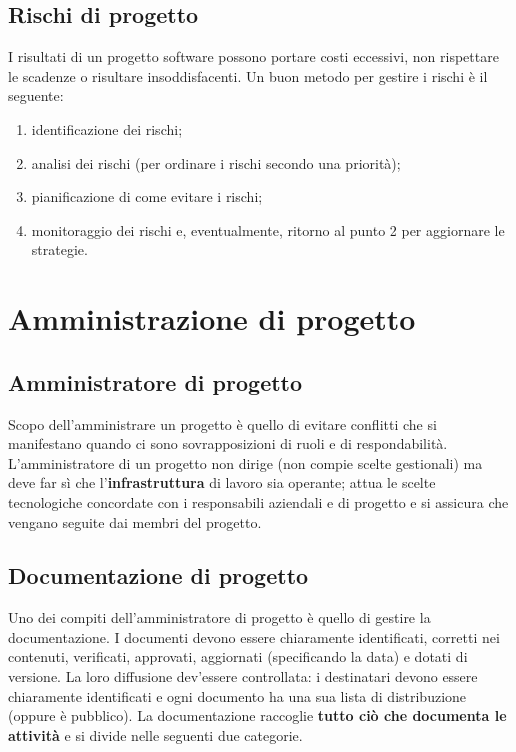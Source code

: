 \documentclass[a4paper]{article}
\begin{document}
		
	\subsection{Rischi di progetto}

		
I risultati di un progetto software possono portare costi eccessivi, non rispettare le scadenze o risultare insoddisfacenti. Un buon metodo per gestire i rischi è il seguente:
		
	\begin{enumerate}
		
			
	\item identificazione dei rischi;
			
	\item analisi dei rischi (per ordinare i rischi secondo una priorità);
			
	\item pianificazione di come evitare i rischi;
			
	\item monitoraggio dei rischi e, eventualmente, ritorno al punto 2 per aggiornare le strategie.
		
	\end{enumerate}

	


		
	\section{Amministrazione di progetto}


		
	\subsection{Amministratore di progetto}

		
Scopo dell'amministrare un progetto è quello di evitare conflitti che si manifestano quando ci sono sovrapposizioni di ruoli e di respondabilità. L'amministratore di un progetto non dirige (non compie scelte gestionali) ma deve far sì che l'\textbf{infrastruttura} di lavoro sia operante; attua le scelte tecnologiche concordate con i responsabili aziendali e di progetto e si assicura che vengano seguite dai membri del progetto.

		
	\subsection{Documentazione di progetto}

		
Uno dei compiti dell'amministratore di progetto è quello di gestire la documentazione. I documenti devono essere chiaramente identificati, corretti nei contenuti, verificati, approvati, aggiornati (specificando la data) e dotati di versione. La loro diffusione dev'essere controllata: i destinatari devono essere chiaramente identificati e ogni documento ha una sua lista di distribuzione (oppure è pubblico). La documentazione raccoglie \textbf{tutto ciò che documenta le attività} e si divide nelle seguenti due categorie.
		
\end{document}
